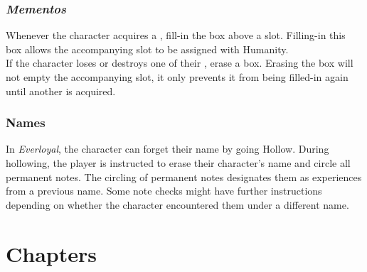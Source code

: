 \documentclass[12pt]{article}
\begin{document}
\begin{multicols*}{2}
\subsubsection{\emph{Mementos}}
\hypertarget{mementos}{}\hypertarget{memento}{}
Whenever the character acquires a , fill-in the  box above a  slot. Filling-in this box allows the accompanying  slot to be assigned with Humanity.\\
If the character loses or destroys one of their , erase a  box. Erasing the  box will not empty the accompanying  slot, it only prevents it from being filled-in again until another  is acquired.

\subsubsection{Names}
In \emph{Everloyal}, the character can forget their name by going Hollow. During hollowing, the player is instructed to erase their character’s name and circle all permanent notes. The circling of permanent notes designates them as experiences from a previous name. Some note checks might have further instructions depending on whether the character encountered them under a different name.

\end{multicols*}
\pagebreak



\section{Chapters}



\pagebreak



\pagebreak

\renewcommand{\arraystretch}{1.5}



\pagebreak



\pagebreak
\end{document}
